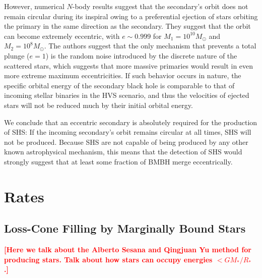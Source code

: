\documentclass[a4paper,twocolumn]{emulateapj}
\newcommand{\colr}[1]{{\bf \textcolor{red}{[#1]}}}
\begin{document}
However, numerical $N$-body results \citep{Iwasawa:2011a,Khan:2012a} suggest that the secondary's orbit does not remain circular during its inspiral owing to a preferential ejection of stars orbiting the primary in the same direction as the secondary. They suggest that the orbit can become extremely eccentric, with $e \sim 0.999$ for $M_{1} = 10^{10} M_{\odot}$ and $M_{2} = 10^{8} M_{\odot}$. The authors suggest that the only mechanism that prevents a total plunge ($e = 1$) is the random noise introduced by the discrete nature of the scattered stars, which suggests that more massive primaries would result in even more extreme maximum eccentricities. If such behavior occurs in nature, the specific orbital energy of the secondary black hole is comparable to that of incoming stellar binaries in the HVS scenario, and thus the velocities of ejected stars will not be reduced much by their initial orbital energy.

We conclude that an eccentric secondary is absolutely required for the production of SHS: If the incoming secondary's orbit remains circular at all times, SHS will not be produced. Because SHS are not capable of being produced by any other known astrophysical mechanism, this means that the detection of SHS would strongly suggest that at least some fraction of BMBH merge eccentrically.

\section{Rates}

\subsection{Loss-Cone Filling by Marginally Bound Stars}

\colr{Here we talk about the Alberto Sesana and Qingjuan Yu method for producing stars. Talk about how stars can occupy energies $< G M_{\ast}/R_{\ast}$ \citep[response to][]{Yu:2003a}.}
\end{document}
